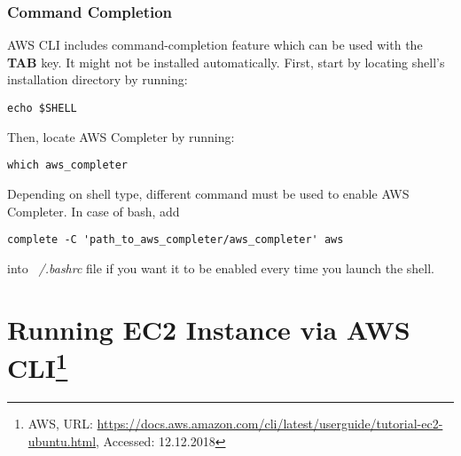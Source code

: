 \documentclass[11pt,english]{article}
\begin{document}
\subsubsection*{Command Completion}
AWS CLI includes command-completion feature which can be used with the \textbf{TAB} key. It might not be installed automatically. 
First, start by locating shell's installation directory by running:
\begin{lstlisting}
echo $SHELL
\end{lstlisting}
Then, locate AWS Completer by running:
\begin{lstlisting}
which aws_completer
\end{lstlisting}
Depending on shell type, different command must be used to enable AWS Completer. In case of bash, add
\begin{lstlisting}
complete -C 'path_to_aws_completer/aws_completer' aws
\end{lstlisting}
into \textit{~/.bashrc} file if you want it to be enabled every time you launch the shell.
 	
\section{\texorpdfstring{Running EC2 Instance via AWS CLI\footnote{AWS, URL: \url{https://docs.aws.amazon.com/cli/latest/userguide/tutorial-ec2-ubuntu.html}, Accessed: 12.12.2018}}{Running EC2 instance via AWS CLI}}
\end{document}
